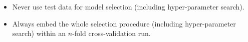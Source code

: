 \begin{frame} 
	\begin{itemize}
		\item Never use test data for model selection 
			(including hyper-parameter search).
		\vspace{4mm}
		\item Always embed the whole selection procedure (including 
			hyper-parameter search) within an $n$-fold cross-validation run.
	\end{itemize}
\end{frame}

